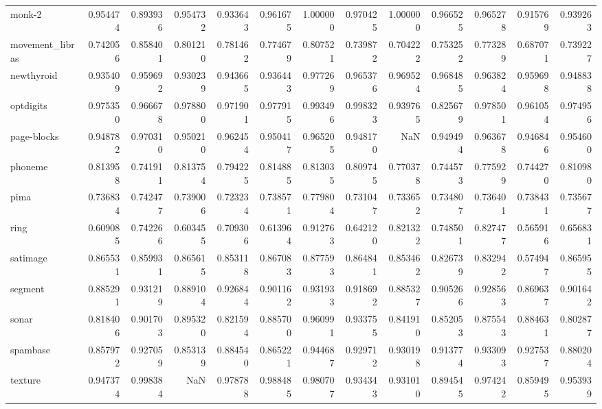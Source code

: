 \begin{tabular}{lrrrrrrrrrrrr}
monk-2          &   0.954474 &  0.893936 &  0.954732 &  0.933643 &  0.961675 &  1.000000 &  0.970425 &  1.000000 &  0.966525 &  0.965278 &  0.915769 &  0.939263 \\
movement\_libras &   0.742056 &  0.858401 &  0.801210 &  0.781462 &  0.774679 &  0.807521 &  0.739872 &  0.704222 &  0.753252 &  0.773289 &  0.687071 &  0.739227 \\
newthyroid      &   0.935409 &  0.959692 &  0.930239 &  0.943665 &  0.936443 &  0.977269 &  0.965376 &  0.969524 &  0.968485 &  0.963824 &  0.959698 &  0.948838 \\
optdigits       &   0.975350 &  0.966678 &  0.978800 &  0.971901 &  0.977915 &  0.993496 &  0.998323 &  0.939765 &  0.825679 &  0.978501 &  0.961054 &  0.974956 \\
page-blocks     &   0.948782 &  0.970310 &  0.950210 &  0.962454 &  0.950417 &  0.965205 &  0.948170 &       NaN &  0.949494 &  0.963678 &  0.946846 &  0.954600 \\
phoneme         &   0.813958 &  0.741911 &  0.813754 &  0.794225 &  0.814885 &  0.813035 &  0.809745 &  0.770378 &  0.744573 &  0.775929 &  0.744270 &  0.810980 \\
pima            &   0.736834 &  0.742477 &  0.739006 &  0.723234 &  0.738571 &  0.779804 &  0.731047 &  0.733652 &  0.734807 &  0.736401 &  0.738431 &  0.735677 \\
ring            &   0.609085 &  0.742266 &  0.603455 &  0.709306 &  0.613964 &  0.912763 &  0.642120 &  0.821322 &  0.748501 &  0.827477 &  0.565916 &  0.656831 \\
satimage        &   0.865531 &  0.859931 &  0.865615 &  0.853118 &  0.867083 &  0.877593 &  0.864841 &  0.853462 &  0.826739 &  0.832942 &  0.574947 &  0.865955 \\
segment         &   0.885291 &  0.931219 &  0.889104 &  0.926844 &  0.901162 &  0.931933 &  0.918692 &  0.885327 &  0.905266 &  0.928563 &  0.869637 &  0.901642 \\
sonar           &   0.818406 &  0.901703 &  0.895320 &  0.821594 &  0.885700 &  0.960991 &  0.933755 &  0.841910 &  0.852053 &  0.875543 &  0.884631 &  0.802877 \\
spambase        &   0.857972 &  0.927059 &  0.853139 &  0.884540 &  0.865221 &  0.944687 &  0.929712 &  0.930198 &  0.913774 &  0.933093 &  0.927537 &  0.880204 \\
texture         &   0.947374 &  0.998384 &       NaN &  0.978788 &  0.988485 &  0.980707 &  0.934343 &  0.931010 &  0.894545 &  0.974242 &  0.859495 &  0.953939 \\

\end{tabular}
